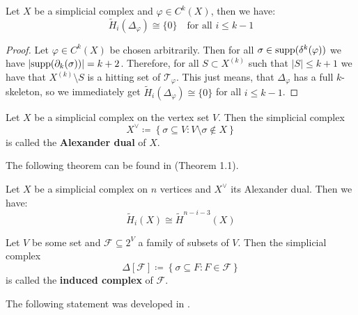 \begin{thm}
Let \(X\) be a simplicial complex and \(\varphi\in C^k(X)\), then we have:
\[
\tilde{H}_i(\Delta_{\varphi})\cong\{0\}\quad\text{for all }i\leq k-1
\]
\begin{proof}
Let \(\varphi\in C^k(X)\) be chosen arbitrarily. Then for all \(\sigma\in \mathrm{supp}(\delta^k(\varphi))\) we have \(\left|\mathrm{supp}(\partial_k(\sigma))\right|=k+2\). Therefore, for all \(S\subset X^{(k)}\) such that \(\left|S\right|\leq k+1\) we have that \(X^{(k)}\setminus S\) is a hitting set of \(\mathcal{T}_{\varphi}\). This just means, that \(\Delta_{\varphi}\) has a full \(k\)-skeleton, so we immediately get \(\tilde{H}_i(\Delta_{\varphi})\cong\{0\}\) for all \(i\leq k-1\).
\end{proof}
\end{thm}

\begin{defi}
Let \(X\) be a simplicial complex on the vertex set \(V\). Then the simplicial complex
\[
X^{\lor}\coloneqq \left\{\sigma\subseteq V:V\setminus\sigma\notin X\right\}
\]
is called the \textbf{Alexander dual} of \(X\).
\end{defi}

The following theorem can be found in \cite{8} (Theorem 1.1).

\begin{thm}\label{theorem12}
Let \(X\) be a simplicial complex on \(n\) vertices and \(X^{\lor}\) its Alexander dual. Then we have:
\[
\tilde{H}_i(X)\cong\tilde{H}^{n-i-3}(X)
\]
\end{thm}

\begin{defi}
Let \(V\) be some set and \(\mathcal{F}\subseteq 2^V\) a family of subsets of \(V\). Then the simplicial complex
\[
\Delta\left[\mathcal{F}\right]\coloneqq \left\{\sigma\subseteq F:F\in\mathcal{F}\right\}
\]
is called the \textbf{induced complex} of \(\mathcal{F}\). 
\end{defi}

The following statement was developed in \cite{9}.

